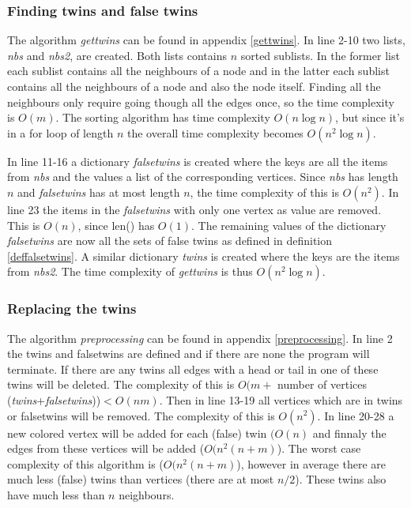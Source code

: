 \documentclass[twoside]{article}
\theoremstyle{definition}
\theoremstyle{plain}
\begin{document}
\begin{multicols}{2}
\subsubsection{Finding twins and false twins}
The algorithm \emph{gettwins} can be found in appendix \ref{gettwins}. In line 2-10 two lists, \emph{nbs} and \emph{nbs2}, are created. Both lists contains $n$ sorted sublists. In the former list each sublist contains all the neighbours of a node and in the latter each sublist contains all the neighbours of a node and also the node itself. Finding all the neighbours only require going though all the edges once, so the time complexity is $O(m)$. The sorting algorithm has time complexity $O(n \log n)$, but since it's in a for loop of length $n$ the overall time complexity becomes $O(n^2 \log n)$. 

In line 11-16 a dictionary \emph{falsetwins} is created where the keys are all the items from \emph{nbs} and the values a list of the corresponding vertices. Since \emph{nbs} has length $n$ and \emph{falsetwins} has at most length $n$, the time complexity of this is $O(n^2)$. In line 23 the items in the \emph{falsetwins} with only one vertex as value are removed. This is $O(n)$, since len() has $O(1)$.\cite{website:pythonTimeComplexity} The remaining values of the dictionary \emph{falsetwins} are now all the sets of false twins as defined in definition \ref{deffalsetwins}. A similar dictionary \emph{twins} is created where the keys are the items from \emph{nbs2}. The time complexity of \textit{gettwins} is thus $O(n^2 \log n)$.


\subsubsection{Replacing the twins}
The algorithm \emph{preprocessing} can be found in appendix \ref{preprocessing}. In line 2 the twins and falsetwins are defined and if there are none the program will terminate. If there are any twins all edges with a head or tail in one of these twins will be deleted. The complexity of this is $O(m +$ number of vertices (\emph{twins}+\emph{falsetwins}))$ < O (nm)$. Then in line 13-19 all vertices which are in twins or falsetwins will be removed. The complexity of this is $O(n^2)$. In line 20-28 a new colored vertex will be added for each (false) twin $(O(n)$ and finnaly the edges from these vertices will be added ($O(n^2 (n+m)$). The worst case complexity of this algorithm is ($O(n^2 (n+m)$), however in average there are much less (false) twins than vertices (there are at most $n/2$). These twins also have much less than $n$ neighbours. 


\end{multicols}
\end{document}
